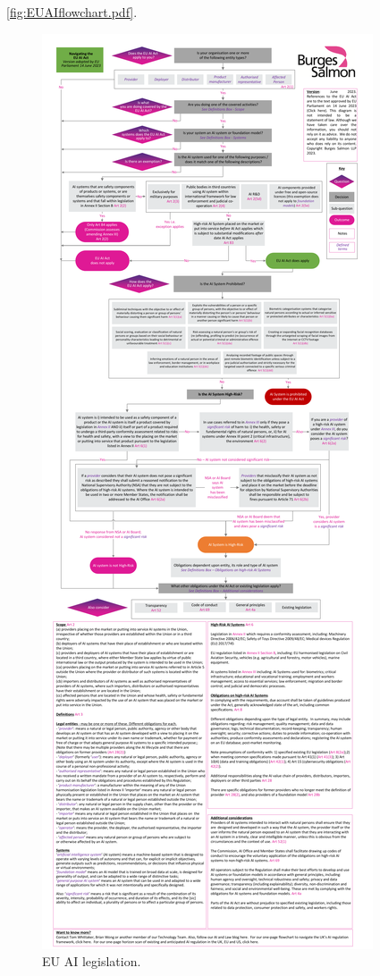 \ref{fig:EUAIflowchart.pdf}. 
\begin{figure}[htbp]
    \centering
    \includegraphics{euaiflowchart.pdf}
    \caption{EU AI legislation.}
    \label{fig:euaiflowchart}
\end{figure}


